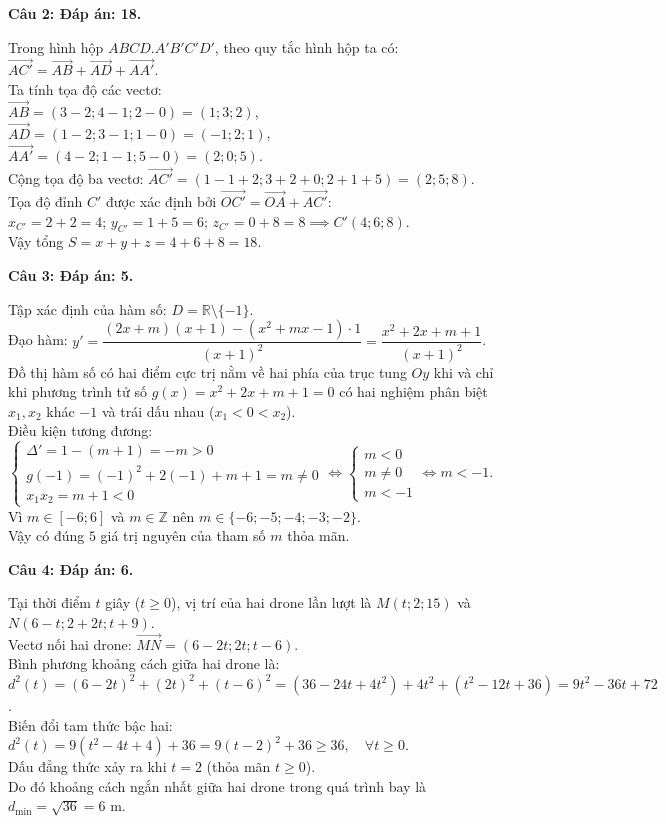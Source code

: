 \documentclass[12pt,a4paper]{article}
\newcommand{\loigiai}[1]{\par\medskip\Needspace{4\baselineskip}\noindent\textbf{#1}\par\nobreak}
\begin{document}
\loigiai{Câu 2: Đáp án: 18.}
Trong hình hộp $ABCD.A'B'C'D'$, theo quy tắc hình hộp ta có:\\
$\vec{AC'}=\vec{AB}+\vec{AD}+\vec{AA'}$.\\
Ta tính tọa độ các vectơ:\\
$\vec{AB}=(3-2;4-1;2-0)=(1;3;2)$,\\
$\vec{AD}=(1-2;3-1;1-0)=(-1;2;1)$,\\
$\vec{AA'}=(4-2;1-1;5-0)=(2;0;5)$.\\
Cộng tọa độ ba vectơ: $\vec{AC'}=(1-1+2;3+2+0;2+1+5)=(2;5;8)$.\\
Tọa độ đỉnh $C'$ được xác định bởi $\vec{OC'}=\vec{OA}+\vec{AC'}$:\\
$x_{C'}=2+2=4$; \quad $y_{C'}=1+5=6$; \quad $z_{C'}=0+8=8 \implies C'(4;6;8)$.\\
Vậy tổng $S=x+y+z=4+6+8=18$.

\loigiai{Câu 3: Đáp án: 5.}
Tập xác định của hàm số: $D=\mathbb{R}\setminus\{-1\}$.\\
Đạo hàm: $y'=\dfrac{(2x+m)(x+1)-(x^2+mx-1)\cdot 1}{(x+1)^2}=\dfrac{x^2+2x+m+1}{(x+1)^2}$.\\
Đồ thị hàm số có hai điểm cực trị nằm về hai phía của trục tung $Oy$ khi và chỉ khi phương trình tử số $g(x)=x^2+2x+m+1=0$ có hai nghiệm phân biệt $x_1, x_2$ khác $-1$ và trái dấu nhau ($x_1<0<x_2$).\\
Điều kiện tương đương:\\
$\begin{cases}
\Delta'=1-(m+1)=-m>0\\
g(-1)=(-1)^2+2(-1)+m+1=m\ne 0\\
x_1 x_2=m+1<0
\end{cases} \iff \begin{cases} m<0\\ m\ne 0\\ m<-1\end{cases} \iff m<-1$.\\
Vì $m\in[-6;6]$ và $m\in\mathbb{Z}$ nên $m\in\{-6;-5;-4;-3;-2\}$.\\
Vậy có đúng $5$ giá trị nguyên của tham số $m$ thỏa mãn.

\loigiai{Câu 4: Đáp án: 6.}
Tại thời điểm $t$ giây ($t\ge 0$), vị trí của hai drone lần lượt là $M(t;2;15)$ và $N(6-t;2+2t;t+9)$.\\
Vectơ nối hai drone: $\vec{MN}=(6-2t;2t;t-6)$.\\
Bình phương khoảng cách giữa hai drone là:\\
$d^2(t)=(6-2t)^2+(2t)^2+(t-6)^2=(36-24t+4t^2)+4t^2+(t^2-12t+36)=9t^2-36t+72$.\\
Biến đổi tam thức bậc hai:\\
$d^2(t)=9(t^2-4t+4)+36=9(t-2)^2+36\ge 36, \quad \forall t\ge 0$.\\
Dấu đẳng thức xảy ra khi $t=2$ (thỏa mãn $t\ge 0$).\\
Do đó khoảng cách ngắn nhất giữa hai drone trong quá trình bay là $d_{\min}=\sqrt{36}=6\text{ m}$.
\end{document}

